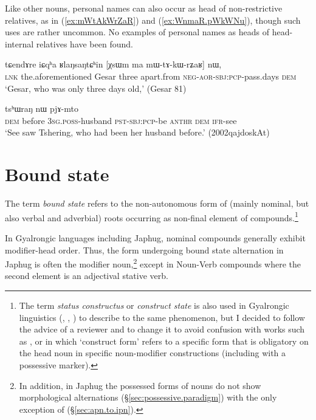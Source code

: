 Like other nouns, personal names can also occur as head of non-restrictive relatives, as in (\ref{ex:mWtAkWrZaR}) and (\ref{ex:WnmaR.pWkWNu}), though such uses are rather uncommon. No examples of personal names as heads of head-internal relatives have been found.

 \begin{exe}
\ex \label{ex:mWtAkWrZaR}
\gll tɕendɤre iɕqʰa ʁlaŋsaŋtɕʰin [χsɯm ma mɯ-tɤ-kɯ-rʑaʁ] nɯ, \\
\textsc{lnk} the.aforementioned Gesar three apart.from \textsc{neg}-\textsc{aor}-\textsc{sbj}:\textsc{pcp}-pass.days \textsc{dem} \\
\glt `Gesar, who was only three days old,' (Gesar 81)
\end{exe}

\begin{exe}
\ex \label{ex:WnmaR.pWkWNu}
 tsʰɯraŋ nɯ pjɤ-mto \\
\textsc{dem} before \textsc{3sg}.\textsc{poss}-husband \textsc{pst}-\textsc{sbj}:\textsc{pcp}-be \textsc{anthr} \textsc{dem} \textsc{ifr}-see \\
\glt `See saw Tshering, who had been her husband before.' (2002qajdoskAt)
\end{exe}


 
\section{Bound state} \label{sec:status.constructus}
The term \textit{bound state} refers to the non-autonomous form of (mainly nominal, but also verbal and adverbial) roots occurring as non-final element of compounds.\footnote{The term  \textit{status constructus} or \textit{construct state} is also used in Gyalrongic linguistics (\citealt{jacques12incorp}, \citealt[163--164]{lai17khroskyabs}, \citealt{gates18harmony}) to describe to the same phenomenon, but I decided to follow the advice of a reviewer and to change it to avoid confusion with works such as \citet{creissels06hongrois}, \citet{creissels17construct} or \citet[30]{gutman18attributive} in which `construct form' refers to a specific form that is obligatory on the head noun in specific noun-modifier constructions (including with a possessive marker). }

In Gyalrongic languages including Japhug, nominal compounds generally exhibit modifier-head order. Thus, the form undergoing bound state alternation in Japhug is often the modifier noun,\footnote{In addition, in Japhug the possessed forms of nouns do not show morphological alternations (§\ref{sec:possessive.paradigm}) with the only exception of  (§\ref{sec:apn.to.ipn}).} except in Noun-Verb compounds where the second element is an adjectival stative verb.

